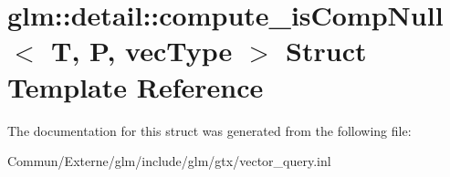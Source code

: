 \hypertarget{structglm_1_1detail_1_1compute__is_comp_null}{}\section{glm\+:\+:detail\+:\+:compute\+\_\+is\+Comp\+Null$<$ T, P, vec\+Type $>$ Struct Template Reference}
\label{structglm_1_1detail_1_1compute__is_comp_null}


The documentation for this struct was generated from the following file\+:\begin{DoxyCompactItemize}
\item 
Commun/\+Externe/glm/include/glm/gtx/vector\+\_\+query.\+inl\end{DoxyCompactItemize}
